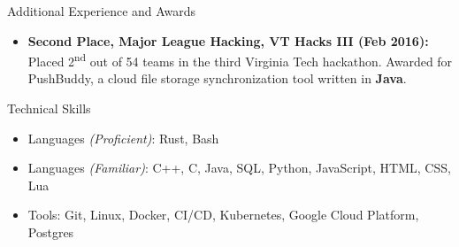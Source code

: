 \documentclass[]{mcdowellcv}
\begin{document}
	\begin{cvsection}{Additional Experience and Awards}
		\begin{cvsubsection}{}{}{}	
			\begin{itemize}
                \item \textbf{Second Place, Major League Hacking, VT Hacks III (Feb 2016):} Placed 2\textsuperscript{nd} out of 54 teams in the third Virginia Tech hackathon. Awarded for PushBuddy, a cloud file storage synchronization tool written in \textbf{Java}.
			\end{itemize}
		\end{cvsubsection}
	\end{cvsection}
	
	\begin{cvsection}{Technical Skills}
		\begin{cvsubsection}{}{}{}	
			\begin{itemize}
                \item Languages \textit{(Proficient)}: Rust, Bash
                \item Languages \textit{(Familiar)}: C++, C, Java, SQL, Python, JavaScript, HTML, CSS, Lua
                \item Tools: Git, Linux, Docker, CI/CD, Kubernetes, Google Cloud Platform, Postgres
			\end{itemize}
		\end{cvsubsection}
	\end{cvsection}
	
\end{document}
